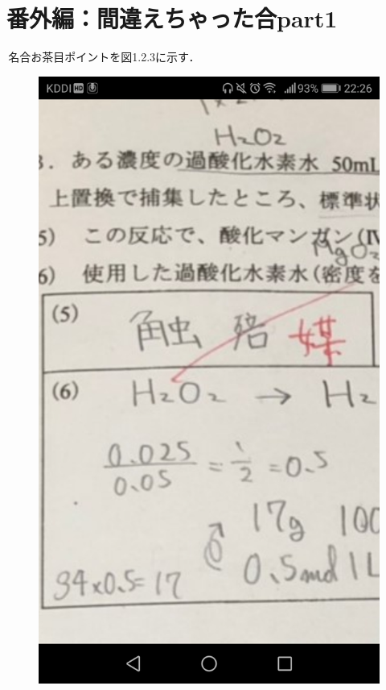 \documentclass[11pt]{jsarticle}
\begin{document}
\part{番外編：間違えちゃった合part1}
\,名合お茶目ポイントを図1.2.3に示す．

\begin{figure}[htbp]
 \begin{minipage}{0.33\hsize}
  \begin{center}
   \includegraphics[scale=0.1]{pic.jpg}

\end{center}
\end{minipage}
\end{figure}
\end{document}
